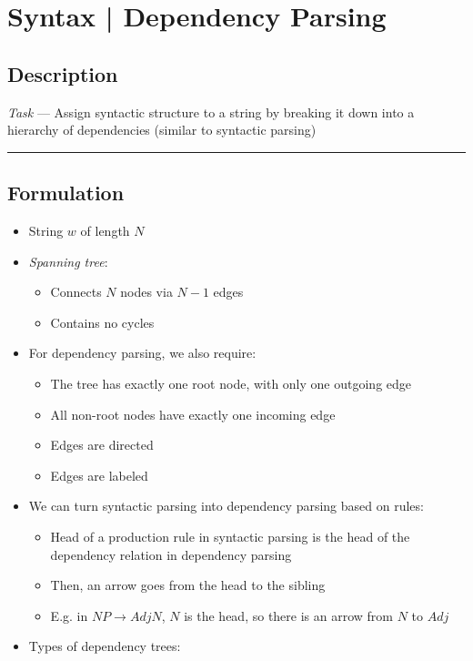 \section{Syntax | Dependency Parsing}
\subsection*{Description}
\emph{Task} --- 
Assign syntactic structure to a string by breaking it down into a hierarchy of dependencies (similar to syntactic parsing)

{\color{black}\hrule height 0.001mm}

\subsection*{Formulation}
\begin{itemize}
    \item String $w$ of length $N$
    \item \emph{Spanning tree}: 
    \begin{itemize}
        \item Connects $N$ nodes via $N-1$ edges
        \item Contains no cycles
    \end{itemize}
    \item For dependency parsing, we also require:
    \begin{itemize}
        \item The tree has exactly one root node, with only one outgoing edge
        \item All non-root nodes have exactly one incoming edge
        \item Edges are directed
        \item Edges are labeled
    \end{itemize}
    \item We can turn syntactic parsing into dependency parsing based on rules:
    \begin{itemize}
        \item Head of a production rule in syntactic parsing is the head of the dependency relation in dependency parsing
        \item Then, an arrow goes from the head to the sibling
        \item E.g. in $NP \to Adj N$, $N$ is the head, so there is an arrow from $N$ to $Adj$
    \end{itemize}
    \item Types of dependency trees:

\end{itemize}
